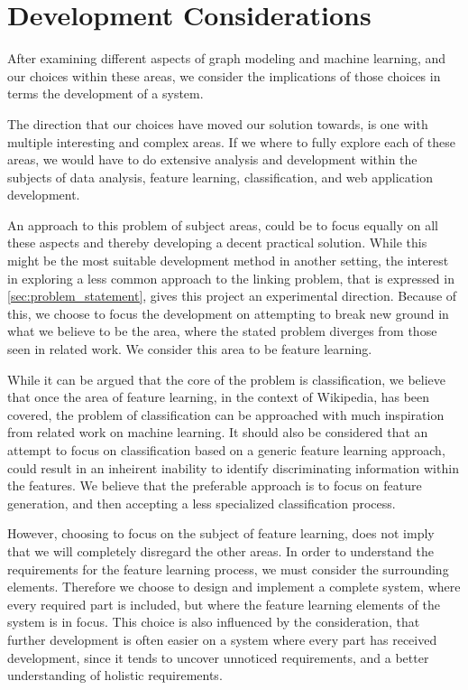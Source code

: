 \section{Development Considerations}

After examining different aspects of graph modeling and machine learning, and our choices within these areas, we consider the implications of those choices in terms the development of a system.

The direction that our choices have moved our solution towards, is one with multiple interesting and complex areas. If we where to fully explore each of these areas, we would have to do extensive analysis and development within the subjects of data analysis, feature learning, classification, and web application development.

An approach to this problem of subject areas, could be to focus equally on all these aspects and thereby developing a decent practical solution. While this might be the most suitable development method in another setting, the interest in exploring a less common approach to the linking problem, that is expressed in \cref{sec:problem_statement}, gives this project an experimental direction. Because of this, we choose to focus the development on attempting to break new ground in what we believe to be the area, where the stated problem diverges from those seen in related work. We consider this area to be feature learning. 

While it can be argued that the core of the problem is classification, we believe that once the area of feature learning, in the context of Wikipedia, has been covered, the problem of classification can be approached with much inspiration from related work on machine learning. It should also be considered that an attempt to focus on classification based on a generic feature learning approach, could result in an inheirent inability to identify discriminating information within the features. We believe that the preferable approach is to focus on feature generation, and then accepting a less specialized classification process.

However, choosing to focus on the subject of feature learning, does not imply that we will completely disregard the other areas. In order to understand the requirements for the feature learning process, we must consider the surrounding elements. Therefore we choose to design and implement a complete system, where every required part is included, but where the feature learning elements of the system is in focus. This choice is also influenced by the consideration, that further development is often easier on a system where every part has received development, since it tends to uncover unnoticed requirements, and a better understanding of holistic requirements.